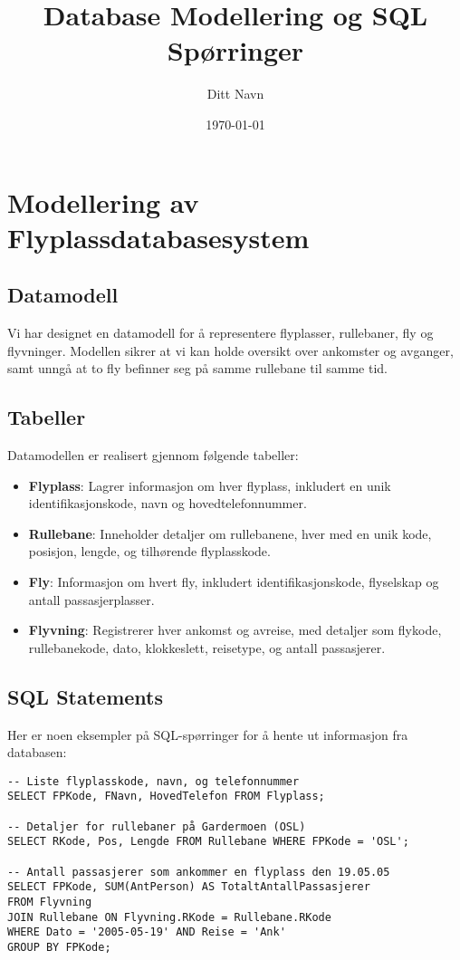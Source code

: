 \documentclass{article}
\title{Database Modellering og SQL Spørringer}
\author{Ditt Navn}
\date{\today}
\begin{document}
\maketitle

\section{Modellering av Flyplassdatabasesystem}

\subsection{Datamodell}
Vi har designet en datamodell for å representere flyplasser, rullebaner, fly og flyvninger. Modellen sikrer at vi kan holde oversikt over ankomster og avganger, samt unngå at to fly befinner seg på samme rullebane til samme tid.

\subsection{Tabeller}
Datamodellen er realisert gjennom følgende tabeller:

\begin{itemize}
    \item \textbf{Flyplass}: Lagrer informasjon om hver flyplass, inkludert en unik identifikasjonskode, navn og hovedtelefonnummer.
    \item \textbf{Rullebane}: Inneholder detaljer om rullebanene, hver med en unik kode, posisjon, lengde, og tilhørende flyplasskode.
    \item \textbf{Fly}: Informasjon om hvert fly, inkludert identifikasjonskode, flyselskap og antall passasjerplasser.
    \item \textbf{Flyvning}: Registrerer hver ankomst og avreise, med detaljer som flykode, rullebanekode, dato, klokkeslett, reisetype, og antall passasjerer.
\end{itemize}

\subsection{SQL Statements}
Her er noen eksempler på SQL-spørringer for å hente ut informasjon fra databasen:

\begin{verbatim}
-- Liste flyplasskode, navn, og telefonnummer
SELECT FPKode, FNavn, HovedTelefon FROM Flyplass;

-- Detaljer for rullebaner på Gardermoen (OSL)
SELECT RKode, Pos, Lengde FROM Rullebane WHERE FPKode = 'OSL';

-- Antall passasjerer som ankommer en flyplass den 19.05.05
SELECT FPKode, SUM(AntPerson) AS TotaltAntallPassasjerer 
FROM Flyvning 
JOIN Rullebane ON Flyvning.RKode = Rullebane.RKode 
WHERE Dato = '2005-05-19' AND Reise = 'Ank' 
GROUP BY FPKode;
\end{verbatim}
\end{document}
